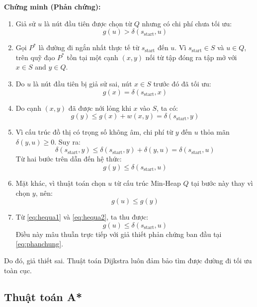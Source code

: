 \documentclass[a4paper, 12pt]{report}
\begin{document}
  \noindent\textbf{Chứng minh (Phản chứng):}
  \begin{enumerate}
      \item Giả sử $u$ là nút đầu tiên được chọn từ $Q$ nhưng có chi phí chưa tối ưu:
      \begin{equation}\label{eq:phanchung}
      g(u) > \delta(s_{\text{start}}, u)
      \end{equation}
      
      \item Gọi $P^*$ là đường đi ngắn nhất thực tế từ $s_{\text{start}}$ đến $u$. Vì $s_{\text{start}} \in S$ và $u \in Q$, trên quỹ đạo $P^*$ tồn tại một cạnh $(x, y)$ nối từ tập đóng ra tập mở với $x \in S$ and $y \in Q$.
      
      \item Do $u$ là nút đầu tiên bị giả sử sai, nút $x \in S$ trước đó đã tối ưu:
      $$g(x) = \delta(s_{\text{start}}, x)$$
      
      \item Do cạnh $(x, y)$ đã được nới lỏng khi $x$ vào $S$, ta có:
      $$g(y) \leq g(x) + w(x, y) = \delta(s_{\text{start}}, y)$$
      
      \item Vì cấu trúc đồ thị có trọng số không âm, chi phí từ $y$ đến $u$ thỏa mãn $\delta(y, u) \geq 0$. Suy ra:
      $$\delta(s_{\text{start}}, y) \leq \delta(s_{\text{start}}, y) + \delta(y, u) = \delta(s_{\text{start}}, u)$$
      Từ hai bước trên dẫn đến hệ thức:
      \begin{equation}\label{eq:hequa1}
      g(y) \leq \delta(s_{\text{start}}, u)
      \end{equation}
      
      \item Mặt khác, vì thuật toán chọn $u$ từ cấu trúc Min-Heap $Q$ tại bước này thay vì chọn $y$, nên:
      \begin{equation}\label{eq:hequa2}
      g(u) \leq g(y)
      \end{equation}
      
      \item Từ \eqref{eq:hequa1} và \eqref{eq:hequa2}, ta thu được:
      $$g(u) \leq \delta(s_{\text{start}}, u)$$
      Điều này mâu thuẫn trực tiếp với giả thiết phản chứng ban đầu tại \eqref{eq:phanchung}.
  \end{enumerate}
  Do đó, giả thiết sai. Thuật toán Dijkstra luôn đảm bảo tìm được đường đi tối ưu toàn cục.

  \subsection{Thuật toán A*}
\end{document}
